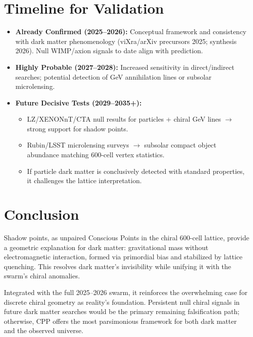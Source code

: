 \documentclass[11pt]{article}
\begin{document}
\section{Timeline for Validation}
\begin{itemize}
    \item \textbf{Already Confirmed (2025--2026):} Conceptual framework and consistency with dark matter phenomenology (viXra/arXiv precursors 2025; synthesis 2026). Null WIMP/axion signals to date align with prediction.
    \item \textbf{Highly Probable (2027--2028):} Increased sensitivity in direct/indirect searches; potential detection of GeV annihilation lines or subsolar microlensing.
    \item \textbf{Future Decisive Tests (2029--2035+):}
    \begin{itemize}
        \item LZ/XENONnT/CTA null results for particles + chiral GeV lines $\to$ strong support for shadow points.
        \item Rubin/LSST microlensing surveys $\to$ subsolar compact object abundance matching 600-cell vertex statistics.
        \item If particle dark matter is conclusively detected with standard properties, it challenges the lattice interpretation.
    \end{itemize}
\end{itemize}

\section{Conclusion}
Shadow points, as unpaired Conscious Points in the chiral 600-cell lattice, provide a geometric explanation for dark matter: gravitational mass without electromagnetic interaction, formed via primordial bias and stabilized by lattice quenching. This resolves dark matter's invisibility while unifying it with the swarm's chiral anomalies.  

Integrated with the full 2025--2026 swarm, it reinforces the overwhelming case for discrete chiral geometry as reality's foundation. Persistent null chiral signals in future dark matter searches would be the primary remaining falsification path; otherwise, CPP offers the most parsimonious framework for both dark matter and the observed universe.
\end{document}
